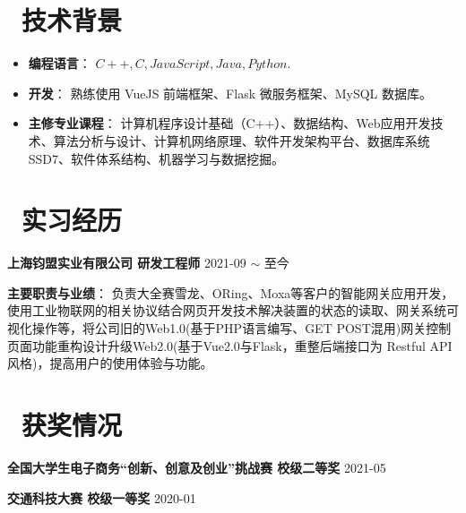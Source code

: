 \documentclass[10pt, a4paper]{article}
\begin{document}
\section{\color{CVBlue}\faCogs\ 技术背景}
\begin{itemize}[parsep=0.5ex]
  \item \textbf{编程语言}： $C++, C, JavaScript, Java, Python$.
  \item \textbf{开发}： 熟练使用 VueJS 前端框架、Flask 微服务框架、MySQL 数据库。
  \item \textbf{主修专业课程}： 计算机程序设计基础（C++）、数据结构、Web应用开发技术、算法分析与设计、计算机网络原理、软件开发架构平台、数据库系统SSD7、软件体系结构、机器学习与数据挖掘。
\end{itemize}

\section{\color{CVBlue}\faBriefcase\ 实习经历}

\textbf{上海钧盟实业有限公司 \quad 研发工程师} \hfill 2021-09 $\sim$ 至今

\textbf{主要职责与业绩}： \quad 负责大全赛雪龙、ORing、Moxa等客户的智能网关应用开发，使用工业物联网的相关协议结合网页开发技术解决装置的状态的读取、网关系统可视化操作等，将公司旧的Web1.0(基于PHP语言编写、GET POST混用)网关控制页面功能重构设计升级Web2.0(基于Vue2.0与Flask，重整后端接口为 Restful API风格)，提高用户的使用体验与功能。

\section{\color{CVBlue}\faHeart\ 获奖情况}

\textbf{全国大学生电子商务“创新、创意及创业”挑战赛 \quad 校级二等奖} \hfill 2021-05

\textbf{交通科技大赛 \quad 校级一等奖} \hfill 2020-01


\end{document}
